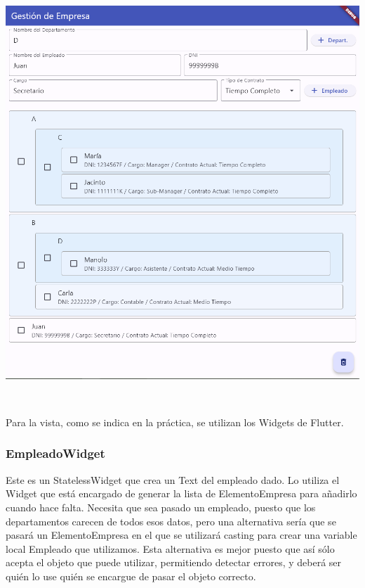 \documentclass[
]{article}
\begin{document}
\subsubsection{\texorpdfstring{\protect\includegraphics[width=5.90625in,height=6.17408in]{imagenes/Vista.png}}{}}\label{section}

Para la vista, como se indica en la práctica, se utilizan los Widgets de
Flutter.

\subsubsection{EmpleadoWidget}\label{empleadowidget}

Este es un StatelessWidget que crea un Text del empleado dado. Lo
utiliza el Widget que está encargado de generar la lista de
ElementoEmpresa para añadirlo cuando hace falta. Necesita que sea pasado
un empleado, puesto que los departamentos carecen de todos esos datos,
pero una alternativa sería que se pasará un ElementoEmpresa en el que se
utilizará casting para crear una variable local Empleado que utilizamos.
Esta alternativa es mejor puesto que así sólo acepta el objeto que puede
utilizar, permitiendo detectar errores, y deberá ser quién lo use quién
se encargue de pasar el objeto correcto.
\end{document}
